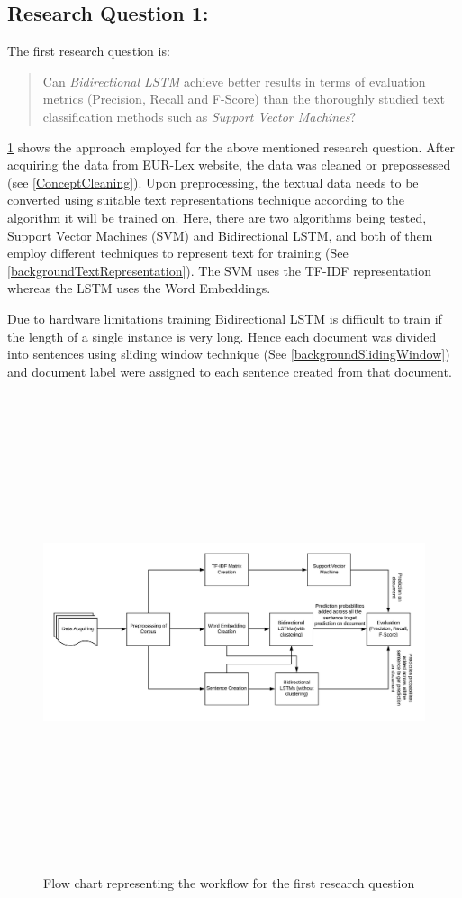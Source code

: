 \subsection{Research Question 1:} \label{question1}
The first research question is:
\begin{quote}
    Can \textit{Bidirectional LSTM} achieve better results in terms of evaluation metrics (Precision, Recall and F-Score) than the thoroughly studied text classification methods such as \textit{Support Vector Machines}?
\end{quote}

\ref{fig:FlowResearchQuestion1} shows the approach employed for the above mentioned research question. After acquiring the data from EUR-Lex website, the data was cleaned or prepossessed (see \ref{ConceptCleaning}). Upon preprocessing, the textual data needs to be converted using suitable text representations technique according to the algorithm it will be trained on. Here, there are two algorithms being tested, Support Vector Machines (SVM) and Bidirectional LSTM, and both of them employ different techniques to represent text for training (See \ref{backgroundTextRepresentation}). The SVM uses the TF-IDF representation whereas the LSTM uses the Word Embeddings. 
 
Due to hardware limitations training Bidirectional LSTM is difficult to train if the length of a single instance is very long. Hence each document was divided into sentences using sliding window technique (See \ref{backgroundSlidingWindow}) and document label were assigned to each sentence created from that document. 

\begin{figure}[!ht]
    \centering
    \includegraphics[width=15cm, height=14cm,keepaspectratio]{pics/flowforQuestion1.jpeg}
    \caption{Flow chart representing the workflow for the first research question }
    \label{fig:FlowResearchQuestion1}
\end{figure}

